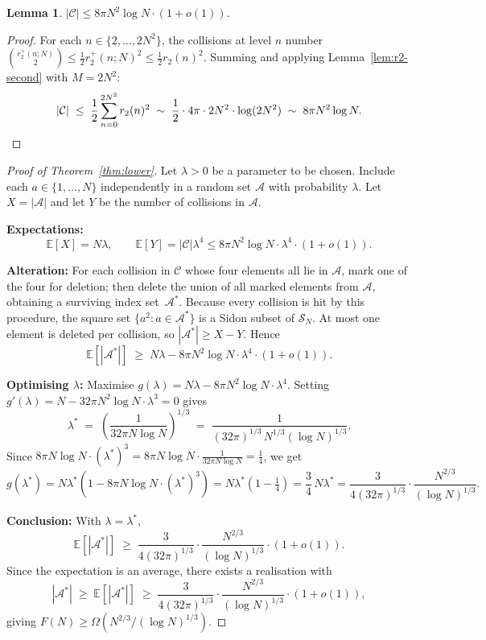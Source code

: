 \documentclass[12pt]{article}
\newtheorem{lemma}[theorem]{Lemma}
\theoremstyle{definition}
\newcommand{\Exp}{\mathbb{E}}
\newcommand{\SN}{\mathcal{S}_N}
\begin{document}
\begin{lemma}\label{lem:C-bound}
$|\mathcal{C}| \le 8\pi N^2\log N \cdot (1+o(1))$.
\end{lemma}

\begin{proof}
For each $n \in \{2,\ldots,2N^2\}$, the collisions at level $n$ number
$\binom{r_2^+(n;N)}{2} \le \frac{1}{2}r_2^+(n;N)^2 \le \frac{1}{2}r_2(n)^2$.
Summing and applying Lemma~\ref{lem:r2-second} with $M = 2N^2$:
\[
  |\mathcal{C}| \;\le\; \frac{1}{2}\sum_{n=0}^{2N^2} r_2(n)^2
  \;\sim\; \frac{1}{2}\cdot 4\pi \cdot 2N^2 \cdot \log(2N^2)
  \;\sim\; 8\pi N^2\log N. \qedhere
\]
\end{proof}

\begin{proof}[Proof of Theorem~\ref{thm:lower}]
Let $\lambda > 0$ be a parameter to be chosen.  Include each
$a \in \{1,\ldots,N\}$ independently in a random set $\mathcal{A}$
with probability $\lambda$.  Let $X = |\mathcal{A}|$ and let $Y$ be
the number of collisions in $\mathcal{A}$.

\noindent\textbf{Expectations:}
\[
  \Exp[X] = N\lambda,
  \qquad
  \Exp[Y] = |\mathcal{C}|\lambda^4 \le 8\pi N^2\log N\cdot\lambda^4\cdot(1+o(1)).
\]

\noindent\textbf{Alteration:}  For each collision in $\mathcal{C}$ whose four
elements all lie in $\mathcal{A}$, mark one of the four for deletion; then
delete the union of all marked elements from $\mathcal{A}$, obtaining a
surviving index set~$\mathcal{A}^*$.  Because every collision is hit
by this procedure, the square set $\{a^2 : a \in \mathcal{A}^*\}$ is a
Sidon subset of $\SN$.  At most one element is deleted per collision,
so $|\mathcal{A}^*| \ge X - Y$.  Hence
\[
  \Exp[|\mathcal{A}^*|] \;\ge\;
  N\lambda - 8\pi N^2\log N\cdot\lambda^4\cdot(1+o(1)).
\]

\noindent\textbf{Optimising $\lambda$:}
Maximise $g(\lambda) = N\lambda - 8\pi N^2\log N\cdot\lambda^4$.
Setting $g'(\lambda) = N - 32\pi N^2\log N\cdot\lambda^3 = 0$ gives
\[
  \lambda^* \;=\; \left(\frac{1}{32\pi N\log N}\right)^{1/3}
  \;=\; \frac{1}{(32\pi)^{1/3}\,N^{1/3}(\log N)^{1/3}}.
\]
Since $8\pi N\log N\cdot(\lambda^*)^3
= 8\pi N\log N\cdot\frac{1}{32\pi N\log N} = \tfrac{1}{4}$, we get
\[
  g(\lambda^*) = N\lambda^*\!\left(1 - 8\pi N\log N\cdot(\lambda^*)^3\right)
  = N\lambda^*\!\left(1 - \tfrac{1}{4}\right)
  = \frac{3}{4}\,N\lambda^*
  = \frac{3}{4(32\pi)^{1/3}}\cdot\frac{N^{2/3}}{(\log N)^{1/3}}.
\]

\noindent\textbf{Conclusion:}
With $\lambda = \lambda^*$,
\[
  \Exp[|\mathcal{A}^*|] \;\ge\;
  \frac{3}{4(32\pi)^{1/3}}\cdot\frac{N^{2/3}}{(\log N)^{1/3}}\cdot(1+o(1)).
\]
Since the expectation is an average, there exists a realisation with
\[
  |\mathcal{A}^*| \;\ge\; \Exp[|\mathcal{A}^*|]
  \;\ge\; \frac{3}{4(32\pi)^{1/3}}\cdot\frac{N^{2/3}}{(\log N)^{1/3}}\cdot(1+o(1)),
\]
giving $F(N) \ge \Omega(N^{2/3}/(\log N)^{1/3})$.
\end{proof}
\end{document}

